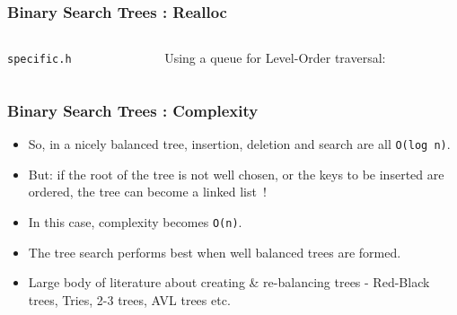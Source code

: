 
\begin{frame}[fragile]
\frametitle{Binary Search Trees : Realloc}
\begin{columns}[T]

\begin{column}{0.45\textwidth}
\verb^specific.h^

\end{column}

\pause
\begin{column}{0.45\textwidth}
Using a queue for Level-Order traversal:

\end{column}

\end{columns}
\end{frame}


\begin{frame}[fragile]
\frametitle{Binary Search Trees : Complexity}

\begin{itemize}[<+->]
\item So, in a nicely balanced tree, insertion, deletion and search are all \verb^O(log n)^.
\item  But: if the root of the tree is not well chosen, or the keys to be inserted are ordered, the tree can become a linked list~!
\item In this case,  complexity becomes \verb^O(n)^.	
\item The tree search performs best when well balanced trees are formed.
\item Large body of literature about creating \& re-balancing trees - Red-Black trees, Tries, 2-3 trees, AVL trees etc.
\end{itemize}

\end{frame}


